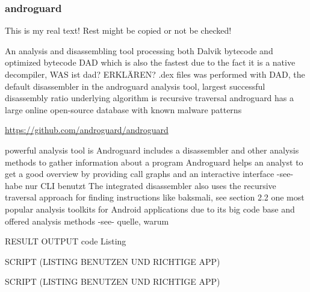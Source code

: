 \subsubsection{androguard} \label{subsection:forensics-tools-java-androguard}
This is my real text! Rest might be copied or not be checked!

%
An analysis and disassembling tool processing both Dalvik bytecode and optimized bytecode\newline
DAD which is also the fastest due to the fact it is a native decompiler, WAS ist dad? ERKLÄREN? .dex files was performed with DAD, the default disassembler
in the androguard analysis tool, largest successful disassembly
ratio\newline
underlying algorithm is recursive traversal\newline
androguard has a large online open-source database with known malware patterns\newline
\cite{kovachevaMaster}
%




\url{https://github.com/androguard/androguard}

powerful analysis tool is Androguard\newline
includes a disassembler and other analysis methods to gather information about a program\newline
Androguard helps an analyst to get a good overview by providing call graphs and an interactive interface -see- habe nur CLI benutzt\newline
The integrated disassembler also uses the recursive traversal approach for finding instructions like baksmali, see section 2.2\newline
one most popular analysis toolkits for Android applications due to its big code base and offered analysis methods -see- quelle, warum\newline


RESULT OUTPUT
code Listing

SCRIPT (LISTING BENUTZEN UND RICHTIGE APP)

SCRIPT (LISTING BENUTZEN UND RICHTIGE APP)


